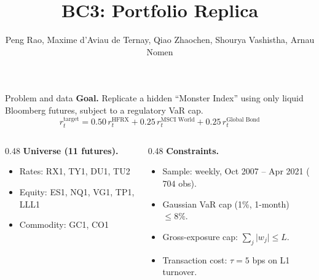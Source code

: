 \documentclass[10pt, aspectratio=169]{beamer}
\title{BC3: Portfolio Replica}
\author{Peng Rao, Maxime d'Aviau de Ternay, Qiao Zhaochen, Shourya Vashistha, Arnau Nomen}
\date{}
\begin{document}
\maketitle

\begin{frame}{Problem and data}
	\textbf{Goal.} Replicate a hidden ``Monster Index'' using only liquid Bloomberg futures, subject to a regulatory VaR cap.
	\[
		r^{\text{target}}_t = 0.50\,r^{\text{HFRX}}_t + 0.25\,r^{\text{MSCI World}}_t + 0.25\,r^{\text{Global Bond}}_t
	\]

	\begin{columns}[T]
		\begin{column}{0.48\textwidth}
			\textbf{Universe (11 futures).}
			\begin{itemize}
				\item Rates: RX1, TY1, DU1, TU2
				\item Equity: ES1, NQ1, VG1, TP1, LLL1
				\item Commodity: GC1, CO1
			\end{itemize}
		\end{column}
		\begin{column}{0.48\textwidth}
			\textbf{Constraints.}
			\begin{itemize}
				\item Sample: weekly, Oct 2007 -- Apr 2021 ($704$ obs).
				\item Gaussian VaR cap (1\%, 1-month) $\le 8\%$.
				\item Gross-exposure cap: $\sum_j \lvert w_j \rvert \le L$.
				\item Transaction cost: $\tau = 5$ bps on L1 turnover.
			\end{itemize}
		\end{column}
	\end{columns}
\end{frame}
\end{document}
